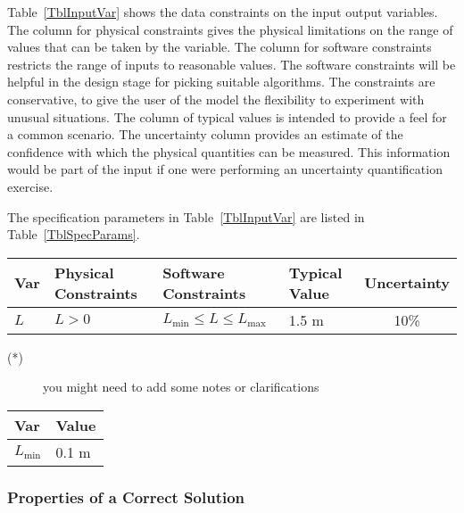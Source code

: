 \documentclass[12pt]{article}
\begin{document}
Table~\ref{TblInputVar} shows the data constraints on the input output
variables.  The column for physical constraints gives the physical limitations
on the range of values that can be taken by the variable.  The column for
software constraints restricts the range of inputs to reasonable values.  The
software constraints will be helpful in the design stage for picking suitable
algorithms.  The constraints are conservative, to give the user of the model the
flexibility to experiment with unusual situations.  The column of typical values
is intended to provide a feel for a common scenario.  The uncertainty column
provides an estimate of the confidence with which the physical quantities can be
measured.  This information would be part of the input if one were performing an
uncertainty quantification exercise.

The specification parameters in Table~\ref{TblInputVar} are listed in
Table~\ref{TblSpecParams}.

\begin{table}[!h]
  \caption{Input Variables} \label{TblInputVar}
  \renewcommand{\arraystretch}{1.2}
\noindent \begin{longtable*}{l l l l c} 
  \toprule
  \textbf{Var} & \textbf{Physical Constraints} & \textbf{Software Constraints} &
                             \textbf{Typical Value} & \textbf{Uncertainty}\\
  \midrule 
  $L$ & $L > 0$ & $L_{\text{min}} \leq L \leq L_{\text{max}}$ & 1.5 \si[per-mode=symbol] {\metre} & 10\%
  \\
  \bottomrule
\end{longtable*}
\end{table}

\noindent 
\begin{description}
\item[(*)] you might need to add some notes or clarifications
\end{description}

\begin{table}[!h]
\caption{Specification Parameter Values} \label{TblSpecParams}
\renewcommand{\arraystretch}{1.2}
\noindent \begin{longtable*}{l l} 
  \toprule
  \textbf{Var} & \textbf{Value} \\
  \midrule 
  $L_\text{min}$ & 0.1 \si{\metre}\\
  \bottomrule
\end{longtable*}
\end{table}

\subsubsection{Properties of a Correct Solution} \label{sec_CorrectSolution}
\end{document}
